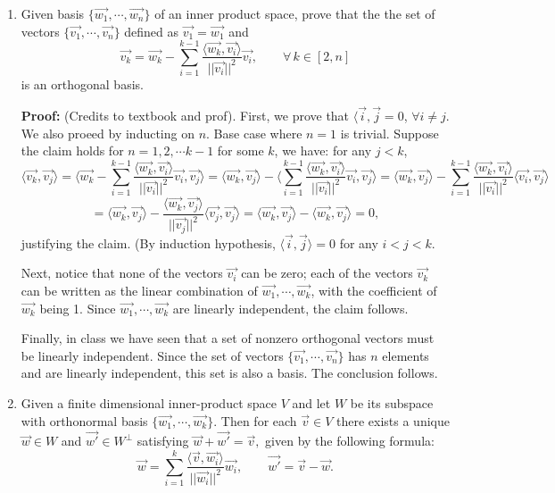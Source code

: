\documentclass[11pt]{article}
\begin{document}
\begin{enumerate}

\item Given basis $\{\vec{w_1}, \cdots , \vec{w_n}\}$ of an inner product space, prove that the the set of vectors $\{\vec{v_1}, \cdots , \vec{v_n}\}$ defined as $\vec{v_1}=\vec{w_1}$ and 
\[\vec{v_k}=\vec{w_k}-\sum_{i=1}^{k-1} \frac{\langle \vec{w_k}, \vec{v_i}\rangle}{||\vec{v_i}||^2}\vec{v_i}, \qquad \forall\, k\in[2,n]\]
is an orthogonal basis. 

\textbf{Proof:}  (Credits to textbook and prof). 
First, we prove that $\langle \vec{i}, \vec{j}=0$, $\forall i\neq j$. We also proeed by inducting on $n$. Base case where $n=1$ is trivial. Suppose the claim holds for $n=1, 2, \cdots k-1$ for some $k$, we have: for any $j<k$, 
\[\langle \vec{v_k}, \vec{v_j}\rangle 
= \langle \vec{w_k}-\sum_{i=1}^{k-1} \frac{\langle \vec{w_k}, \vec{v_i}\rangle}{||\vec{v_i}||^2}\vec{v_i}, \vec{v_j}\rangle
=\langle \vec{w_k}, \vec{v_j}\rangle-\langle\sum_{i=1}^{k-1} \frac{\langle \vec{w_k}, \vec{v_i}\rangle}{||\vec{v_i}||^2}\vec{v_i}, \vec{v_j}\rangle
=\langle \vec{w_k}, \vec{v_j}\rangle-\sum_{i=1}^{k-1} \frac{\langle \vec{w_k}, \vec{v_i}\rangle}{||\vec{v_i}||^2}\langle\vec{v_i}, \vec{v_j}\rangle\]
\[=\langle \vec{w_k}, \vec{v_j}\rangle-\frac{\langle \vec{w_k}, \vec{v_j}\rangle}{||\vec{v_j}||^2}\langle\vec{v_j}, \vec{v_j}\rangle
=\langle \vec{w_k}, \vec{v_j}\rangle-\langle \vec{w_k}, \vec{v_j}\rangle
=0,
\]
justifying the claim. (By induction hypothesis, $\langle \vec{i}, \vec{j}\rangle=0$ for any $i<j<k$. 

Next, notice that none of the vectors $\vec{v_i}$ can be zero; each of the vectors $\vec{v_k}$ can be written as the linear combination of $\vec{w_1}, \cdots , \vec{w_k}$, with the coefficient of $\vec{w_k}$ being 1. Since $\vec{w_1}, \cdots , \vec{w_k}$ are linearly independent, the claim follows. 

Finally, in class we have seen that a set of nonzero orthogonal vectors must be linearly independent. Since the set of vectors 
$\{\vec{v_1}, \cdots , \vec{v_n}\}$ has $n$ elements and are linearly independent, this set is also a basis. The conclusion follows. 

\item Given a finite dimensional inner-product space $V$ and let $W$ be its subspace with orthonormal basis 
$\{\vec{w_1}, \cdots , \vec{w_k}\}.$ 
Then for each $\vec{v}\in V$ there exists a unique $\vec{w}\in W$ and $\vec{w'}\in W^{\perp}$ satisfying $\vec{w}+\vec{w'}=\vec{v}, $ given by the following formula:
\[\vec{w}=\sum_{i=1}^k \frac{\langle\vec{v}, \vec{w_i}\rangle}{||\vec{w_i}||^2 }\vec{w_i},\qquad \vec{w'}=\vec{v}-\vec{w}.\]


\end{enumerate}
\end{document}
